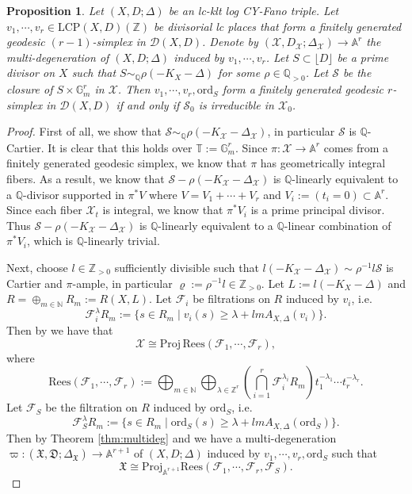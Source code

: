 \documentclass[reqno, 12pt]{amsart}
\newtheorem{prop}{Proposition}[section]
\theoremstyle{definition}
\newcommand{\bA}{\mathbb{A}}
\newcommand{\bQ}{\mathbb{Q}}
\newcommand{\bZ}{\mathbb{Z}}
\newcommand{\bN}{\mathbb{N}}
\newcommand{\bG}{\mathbb{G}}
\newcommand{\bT}{\mathbb{T}}
\newcommand{\cX}{\mathcal{X}}
\newcommand{\cF}{\mathcal{F}}
\newcommand{\cD}{\mathcal{D}}
\newcommand{\cS}{\mathcal{S}}
\newcommand{\ord}{\mathrm{ord}}
\newcommand{\Proj}{\mathrm{Proj}}
\newcommand{\fX}{\mathfrak{X}}
\newcommand{\fD}{\mathfrak{D}}
\newcommand{\LCP}{\mathrm{LCP}}
\newcommand{\Rees}{\mathrm{Rees}}
\numberwithin{equation}{section}
\begin{document}
\begin{prop}\label{prop:deg-normal-cone}
Let $(X,D;\Delta)$ be an lc-klt log CY-Fano triple.  Let $v_1,\cdots, v_r\in \LCP(X,D)(\bZ)$ be divisorial lc places that form a finitely generated geodesic $(r-1)$-simplex in $\cD(X,D)$. Denote by $(\cX, D_{\cX};\Delta_{\cX})\to \bA^r$ the multi-degeneration of $(X,D;\Delta)$ induced by $v_1,\cdots, v_r$. Let $S\subset \lfloor D \rfloor$ be a prime divisor on $X$ such that $S\sim_{\bQ} \rho (-K_X-\Delta)$ for some $\rho\in \bQ_{>0}$.
Let $\cS$ be the closure of $S\times \bG_m^r$ in $\cX$. 
 Then $v_1,\cdots, v_r, \ord_S$ form a finitely generated geodesic $r$-simplex in $\cD(X,D)$ if and only if $\cS_0$ is irreducible in $\cX_0$.  
\end{prop}

\begin{proof}
First of all, we show that $\cS \sim_{\bQ} \rho(-K_{\cX} - \Delta_{\cX})$, in particular $\cS$ is $\bQ$-Cartier. It is clear that this holds over $\bT:= \bG_m^r$. Since $\pi:\cX\to \bA^r$ comes from a finitely generated geodesic simplex, we know that $\pi$ has geometrically integral fibers. As a result, we know that $\cS - \rho(-K_{\cX}-\Delta_{\cX})$ is $\bQ$-linearly equivalent to a $\bQ$-divisor supported in $\pi^* V$ where $V= V_1+\cdots + V_r$ and $V_i:= (t_i=0)\subset \bA^r$. Since each fiber $\cX_t$ is integral, we know that $\pi^* V_i$ is a prime principal divisor. Thus $\cS - \rho(-K_{\cX}-\Delta_{\cX})$ is $\bQ$-linearly equivalent to a $\bQ$-linear combination of $\pi^* V_i$, which is $\bQ$-linearly trivial. 

Next, choose $l\in \bZ_{>0}$ sufficiently divisible such that $l(-K_{\cX}-\Delta_{\cX}) \sim \rho^{-1} l \cS$ is   Cartier and $\pi$-ample, in particular $\varrho:=\rho^{-1} l\in \bZ_{>0}$. Let $L:= l(-K_X-\Delta)$ and $R=\oplus_{m\in \bN} R_m := R(X,L)$. Let $\cF_i$ be filtrations on $R$ induced by $v_i$, i.e. 
\[
\cF_i^\lambda R_m := \{s\in R_m\mid v_i(s)\geq \lambda + lm A_{X,\Delta}(v_i)\}.
\]
Then by \cite[Proposition 3.17]{BL26} we have that 
\[
\cX \cong \Proj\, \Rees(\cF_1, \cdots, \cF_r),
\]
where
\[
\Rees(\cF_1, \cdots, \cF_r):= \bigoplus_{m\in\bN}\bigoplus_{\lambda\in \bZ^r} \left(\bigcap_{i=1}^r \cF_i^{\lambda_i} R_m \right) t_1^{-\lambda_1}\cdots t_r^{-\lambda_r}.
\]
Let $\cF_S$ be the filtration on $R$ induced by $\ord_S$, i.e.
\[
\cF_S^\lambda R_m := \{s\in R_m\mid \ord_S(s)\geq \lambda + lm A_{X,\Delta}(\ord_S)\}.
\]
Then by Theorem \ref{thm:multideg} and \cite[Proposition 3.17]{BL26} we have a multi-degeneration $\varpi: (\fX,\fD;\Delta_{\fX}) \to \bA^{r+1}$ of $(X,D;\Delta)$ induced by $v_1,\cdots, v_r, \ord_S$ such that 
\[
\fX \cong \Proj_{\bA^{r+1}}\Rees(\cF_1, \cdots, \cF_r, \cF_S).
\]


\end{proof}
\end{document}
